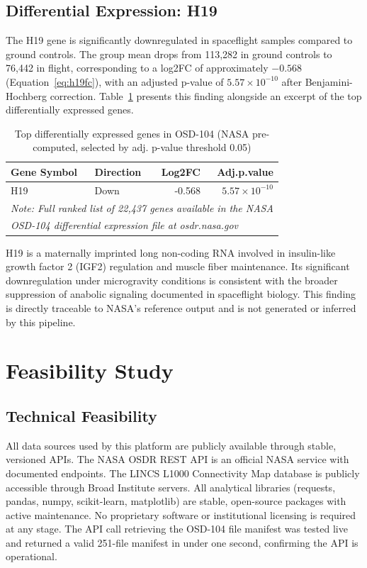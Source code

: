 \documentclass[conference]{IEEEtran}
\begin{document}
\subsection{Differential Expression: H19}
The H19 gene is significantly downregulated in spaceflight samples compared to ground controls. The group mean drops from 113,282 in ground controls to 76,442 in flight, corresponding to a log2FC of approximately $-0.568$ (Equation~\ref{eq:h19fc}), with an adjusted p-value of $5.57 \times 10^{-10}$ after Benjamini-Hochberg correction. Table~\ref{tab:top_genes} presents this finding alongside an excerpt of the top differentially expressed genes.

\begin{table}[!t]
\centering
\caption{Top differentially expressed genes in OSD-104 (NASA pre-computed, selected by adj. p-value threshold 0.05)}
\label{tab:top_genes}
\begin{tabular}{llrr}
\toprule
\textbf{Gene Symbol} & \textbf{Direction} & \textbf{Log2FC} & \textbf{Adj.p.value} \\
\midrule
H19 & Down & -0.568 & $5.57 \times 10^{-10}$ \\
\midrule
\multicolumn{4}{l}{\small \textit{Note: Full ranked list of 22,437 genes available in the NASA}} \\
\multicolumn{4}{l}{\small \textit{OSD-104 differential expression file at osdr.nasa.gov}} \\
\bottomrule
\end{tabular}
\end{table}

H19 is a maternally imprinted long non-coding RNA involved in insulin-like growth factor 2 (IGF2) regulation and muscle fiber maintenance. Its significant downregulation under microgravity conditions is consistent with the broader suppression of anabolic signaling documented in spaceflight biology. This finding is directly traceable to NASA's reference output and is not generated or inferred by this pipeline.

\section{Feasibility Study}

\subsection{Technical Feasibility}
All data sources used by this platform are publicly available through stable, versioned APIs. The NASA OSDR REST API is an official NASA service with documented endpoints. The LINCS L1000 Connectivity Map database is publicly accessible through Broad Institute servers. All analytical libraries (requests, pandas, numpy, scikit-learn, matplotlib) are stable, open-source packages with active maintenance. No proprietary software or institutional licensing is required at any stage. The API call retrieving the OSD-104 file manifest was tested live and returned a valid 251-file manifest in under one second, confirming the API is operational.
\end{document}

